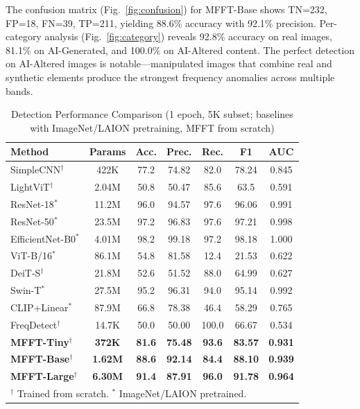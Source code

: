 \documentclass[journal]{IEEEtran}
\begin{document}
The confusion matrix (Fig.~\ref{fig:confusion}) for MFFT-Base shows TN=232, FP=18, FN=39, TP=211, yielding 88.6\% accuracy with 92.1\% precision. Per-category analysis (Fig.~\ref{fig:category}) reveals 92.8\% accuracy on real images, 81.1\% on AI-Generated, and 100.0\% on AI-Altered content. The perfect detection on AI-Altered images is notable---manipulated images that combine real and synthetic elements produce the strongest frequency anomalies across multiple bands.

\begin{table}[!t]
\renewcommand{\arraystretch}{1.2}
\caption{Detection Performance Comparison (1 epoch, 5K subset; baselines with ImageNet/LAION pretraining, MFFT from scratch)}
\label{tab:main}
\centering
\begin{tabular}{|l|c|c|c|c|c|c|}
\hline
Method & Params & Acc. & Prec. & Rec. & F1 & AUC \\
\hline
SimpleCNN$^\dagger$ & 422K & 77.2 & 74.82 & 82.0 & 78.24 & 0.845 \\
LightViT$^\dagger$ & 2.04M & 50.8 & 50.47 & 85.6 & 63.5 & 0.591 \\
ResNet-18$^*$ & 11.2M & 96.0 & 94.57 & 97.6 & 96.06 & 0.991 \\
ResNet-50$^*$ & 23.5M & 97.2 & 96.83 & 97.6 & 97.21 & 0.998 \\
EfficientNet-B0$^*$ & 4.01M & 98.2 & 99.18 & 97.2 & 98.18 & 1.000 \\
ViT-B/16$^*$ & 86.1M & 54.8 & 81.58 & 12.4 & 21.53 & 0.622 \\
DeiT-S$^\dagger$ & 21.8M & 52.6 & 51.52 & 88.0 & 64.99 & 0.627 \\
Swin-T$^*$ & 27.5M & 95.2 & 96.31 & 94.0 & 95.14 & 0.992 \\
CLIP+Linear$^*$ & 87.9M & 66.8 & 78.38 & 46.4 & 58.29 & 0.765 \\
FreqDetect$^\dagger$ & 14.7K & 50.0 & 50.00 & 100.0 & 66.67 & 0.534 \\
\hline
\textbf{MFFT-Tiny}$^\dagger$ & \textbf{372K} & \textbf{81.6} & \textbf{75.48} & \textbf{93.6} & \textbf{83.57} & \textbf{0.931} \\
\textbf{MFFT-Base}$^\dagger$ & \textbf{1.62M} & \textbf{88.6} & \textbf{92.14} & \textbf{84.4} & \textbf{88.10} & \textbf{0.939} \\
\textbf{MFFT-Large}$^\dagger$ & \textbf{6.30M} & \textbf{91.4} & \textbf{87.91} & \textbf{96.0} & \textbf{91.78} & \textbf{0.964} \\
\hline
\multicolumn{7}{l}{$^\dagger$ Trained from scratch. $^*$ ImageNet/LAION pretrained.} \\
\end{tabular}
\end{table}
\end{document}
